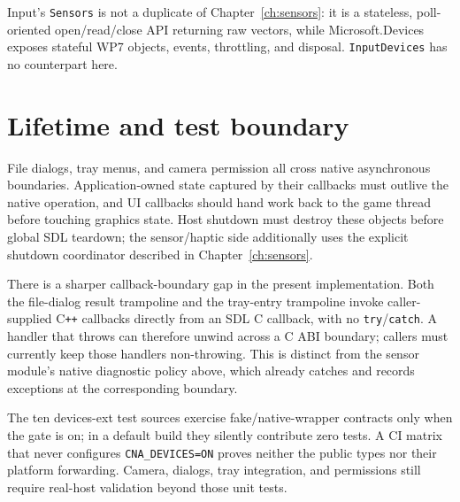 Input's \texttt{Sensors} is not a duplicate of Chapter~\ref{ch:sensors}: it is a stateless,
poll-oriented open/read/close API returning raw vectors, while Microsoft.Devices exposes
stateful WP7 objects, events, throttling, and disposal. \texttt{InputDevices} has no counterpart
here.

\section{Lifetime and test boundary}

File dialogs, tray menus, and camera permission all cross native asynchronous boundaries.
Application-owned state captured by their callbacks must outlive the native operation, and UI
callbacks should hand work back to the game thread before touching graphics state. Host shutdown
must destroy these objects before global SDL teardown; the sensor/haptic side additionally uses
the explicit shutdown coordinator described in Chapter~\ref{ch:sensors}.

There is a sharper callback-boundary gap in the present implementation. Both the file-dialog
result trampoline and the tray-entry trampoline invoke caller-supplied C\texttt{++} callbacks
directly from an SDL C callback, with no \texttt{try}/\texttt{catch}. A handler that throws can
therefore unwind across a C ABI boundary; callers must currently keep those handlers
non-throwing. This is distinct from the sensor module's native diagnostic policy above, which
already catches and records exceptions at the corresponding boundary.

The ten devices-ext test sources exercise fake/native-wrapper contracts only when the gate is
on; in a default build they silently contribute zero tests. A CI matrix that never configures
\texttt{CNA\_DEVICES=ON} proves neither the public types nor their platform forwarding. Camera,
dialogs, tray integration, and permissions still require real-host validation beyond those unit
tests.

